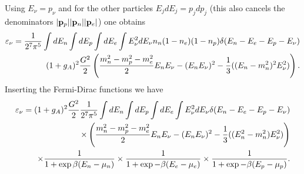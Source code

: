 Using $E_{\nu}=p_{\nu}$ and for the other particles $E_jdE_j=p_jdp_j$ 
(this also cancels the denominators $|{\bf p}_p||{\bf p}_n||{\bf p}_e|$) one obtains
\begin{eqnarray}
      \varepsilon_{\nu}=\frac{1}{2^7\pi^5}\int dE_n
                  \int dE_p\int dE_e\int E_{\nu}^2dE_{\nu}
                  n_n(1-n_e)(1-n_p)\delta (E_n-E_e-E_p-E_{\nu})\cr
             (1+g_A)^2\frac{G^2}{2}
             \left(\frac{m_n^2-m_p^2-m_e^2}{2}E_nE_{\nu}  - 
             (E_nE_{\nu})^2-\frac{1}{3}((E_n-m_n^2)^2E_{\nu}^2)\right).
      \label{eq:emis3}
\end{eqnarray}
Inserting the Fermi-Dirac functions we have
\begin{eqnarray}
      \varepsilon_{\nu}=(1+g_A)^2\frac{G^2}{2}\frac{1}{2^7\pi^5}\int dE_n
                  \int dE_p\int dE_e
                  \int E_{\nu}^2dE_{\nu}
                  \delta (E_n-E_e-E_p-E_{\nu})\nonumber\cr       
       \times \left(\frac{m_n^2-m_p^2-m_e^2}{2}E_nE_{\nu}  - (E_nE_{\nu})^2-
       \frac{1}{3}((E_n^2-m_n^2)E_{\nu}^2)\right)\nonumber \\
      \times\frac{1}{1+\exp{\beta (E_n-\mu_n)}}
      \times\frac{1}{1+\exp{-\beta (E_e-\mu_e)}}
      \times\frac{1}{1+\exp{-\beta (E_p-\mu_p)}}.
      \label{eq:emis4}
\end{eqnarray}

